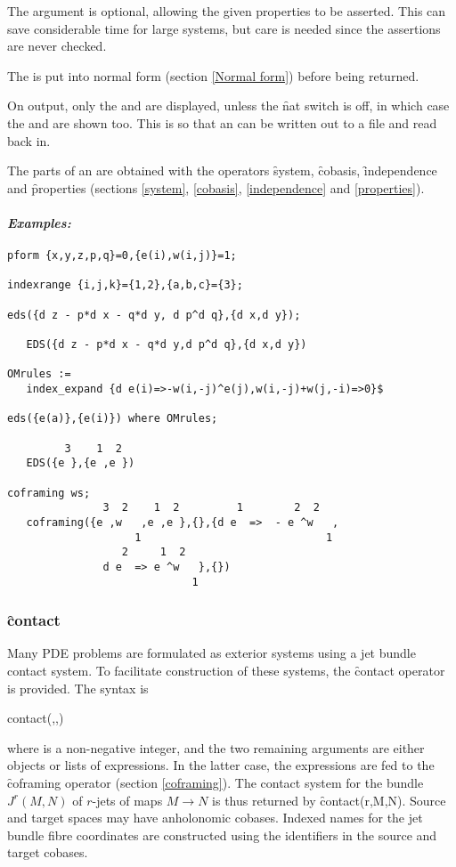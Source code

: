 The  argument is optional, allowing the given properties
to be asserted. This can save considerable time for large systems, but care
is needed since the assertions are never checked.

The  is put into normal form (section \ref{Normal form}) before
being returned.

On output, only the  and  are
displayed, unless the \f{nat} switch is off, in which case the
 and  are shown too. This is so that an
 can be written out to a file and read back in.

The parts of an  are obtained with the operators \f{system},
\f{cobasis}, \f{independence} and \f{properties} (sections \ref{system},
\ref{cobasis}, \ref{independence} and \ref{properties}).

\paragraph{\textit{Examples:}}
\begin{verbatim}
pform {x,y,z,p,q}=0,{e(i),w(i,j)}=1;

indexrange {i,j,k}={1,2},{a,b,c}={3};

eds({d z - p*d x - q*d y, d p^d q},{d x,d y});

   EDS({d z - p*d x - q*d y,d p^d q},{d x,d y})

OMrules :=
   index_expand {d e(i)=>-w(i,-j)^e(j),w(i,-j)+w(j,-i)=>0}$

eds({e(a)},{e(i)}) where OMrules;

         3    1  2
   EDS({e },{e ,e })

coframing ws;
               3  2    1  2         1        2  2
   coframing({e ,w   ,e ,e },{},{d e  =>  - e ^w   ,
                    1                             1
                  2     1  2
               d e  => e ^w   },{})
                             1
\end{verbatim}

\subsubsection{\f{contact}}
\label{contact}

\hypertarget{operator:CONTACT}{}
Many PDE problems are formulated as exterior systems using a jet bundle
contact system. To facilitate construction of these systems, the
\f{contact} operator is provided. The syntax is
\begin{syntax}
	contact(,,)
\end{syntax}
where  is a non-negative integer, and the two remaining
arguments are either  objects or lists of 
expressions. In the latter case, the expressions are fed to the
\f{coframing} operator (section \ref{coframing}). The contact system for the
bundle $J^r(M,N)$ of $r$-jets of maps $M\to N$ is thus returned by
\f{contact(r,M,N)}. Source and target spaces may have anholonomic
cobases. Indexed names for the jet bundle fibre coordinates are constructed
using the identifiers in the source and target cobases.

